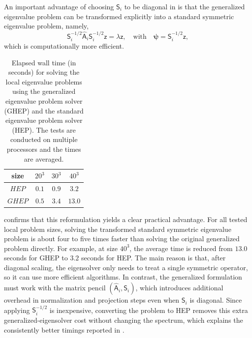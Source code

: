 \documentclass[preprint,12pt]{elsarticle}
\begin{document}
  An important advantage of choosing $\mathsf{S}_{i}$ to be diagonal in 
  is that the generalized eigenvalue problem can be transformed explicitly into a
  standard symmetric eigenvalue problem, namely,
  \[
    \mathsf{S}_{i}^{-1/2}\widehat{\mathsf{A}}_{i}\mathsf{S}_{i}^{-1/2}\mathsf{z}=
    \lambda \mathsf{z}, \quad \text{with}\quad \boldsymbol{\psi}=\mathsf{S}_{i}^{-1/2}
    \mathsf{z},
  \]
  which is computationally more efficient.
  \begin{table}
    [!ht]
    \begin{center}
      \caption{Elapsed wall time (in seconds) for solving the local eigenvalue
      problems using the generalized eigenvalue problem solver (GHEP) and the
      standard eigenvalue problem solver (HEP). The tests are conducted on multiple
      processors and the times are averaged.}
      \label{tab:GHEPvsHEP}
      \begin{tabular}{cccc}
        \toprule size  & $20^{3}$ & $30^{3}$ & $40^{3}$ \\
        \midrule $HEP$ & $0.1$    & $0.9$    & $3.2$    \\
        $GHEP$         & $0.5$    & $3.4$    & $13.0$   \\
        \bottomrule
      \end{tabular}
    \end{center}
  \end{table}

   confirms that this reformulation yields a clear practical
  advantage. For all tested local problem sizes, solving the transformed standard
  symmetric eigenvalue problem is about four to five times faster than solving the
  original generalized problem directly. For example, at size $40^{3}$, the
  average time is reduced from $13.0$ seconds for GHEP to $3.2$ seconds for HEP.
  The main reason is that, after diagonal scaling, the eigensolver only needs to
  treat a single symmetric operator, so it can use more efficient algorithms. In
  contrast, the generalized formulation must work with the matrix pencil
  $(\widehat{\mathsf{A}}_{i},\mathsf{S}_{i})$, which introduces additional overhead
  in normalization and projection steps even when $\mathsf{S}_{i}$ is diagonal.
  Since applying $\mathsf{S}_{i}^{-1/2}$ is inexpensive, converting the problem to
  HEP removes this extra generalized-eigensolver cost without changing the spectrum,
  which explains the consistently better timings reported in
  .
\end{document}
